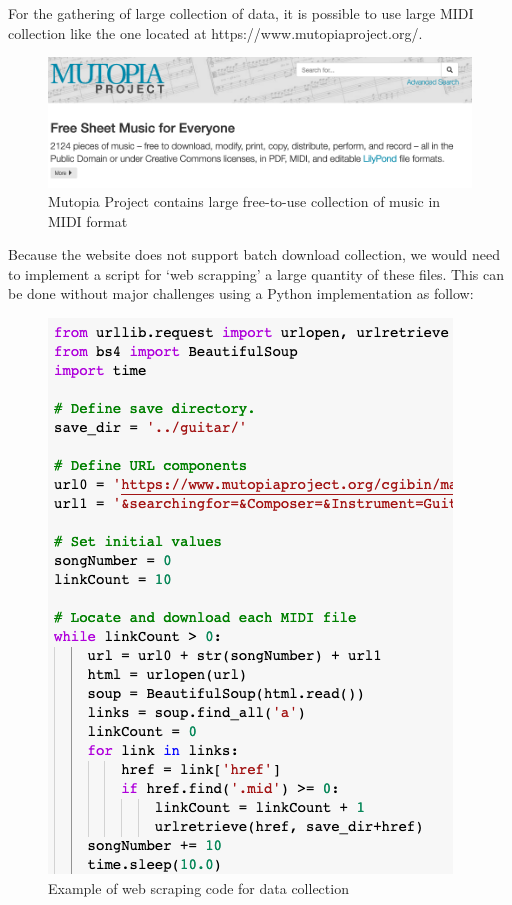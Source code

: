 For the gathering of large collection of data, it is possible to use large MIDI collection
like the one located at https://www.mutopiaproject.org/.

\begin{figure}[h!]
  \includegraphics[width=\linewidth]{image/fig_JDF15.png}
  \caption{Mutopia Project contains large free-to-use collection of music in MIDI format }
\end{figure}


Because the website does not support batch download collection, we would need to implement
a script for ‘web scrapping’ a large quantity of these files. This can be done without
major challenges using a Python implementation as follow:

\begin{figure}[h!]
  \includegraphics[width=\linewidth]{image/fig_JDF16.png}
  \caption{Example of web scraping code for data collection }
\end{figure}


